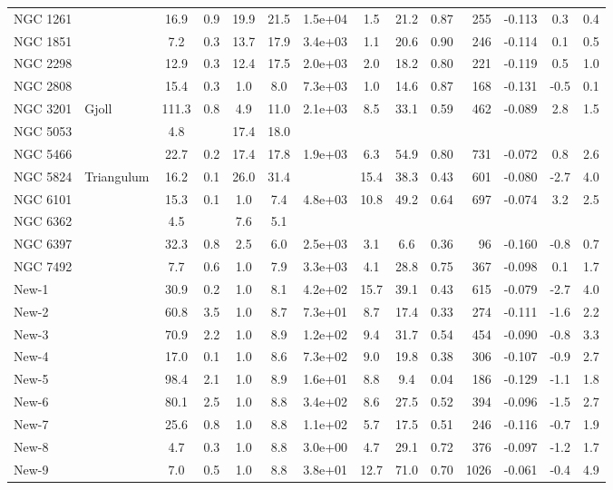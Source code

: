 \begin{tabular}{llSSSSSSSSrSSS}
NGC 1261 &  & 16.9 & 0.9 & 19.9 & 21.5 & 1.5e+04 & 1.5 & 21.2 & 0.87 & 255 & -0.113 & 0.3 & 0.4 \\
NGC 1851 &  & 7.2 & 0.3 & 13.7 & 17.9 & 3.4e+03 & 1.1 & 20.6 & 0.90 & 246 & -0.114 & 0.1 & 0.5 \\
NGC 2298 &  & 12.9 & 0.3 & 12.4 & 17.5 & 2.0e+03 & 2.0 & 18.2 & 0.80 & 221 & -0.119 & 0.5 & 1.0 \\
NGC 2808 &  & 15.4 & 0.3 & 1.0 & 8.0 & 7.3e+03 & 1.0 & 14.6 & 0.87 & 168 & -0.131 & -0.5 & 0.1 \\
NGC 3201 & Gjoll & 111.3 & 0.8 & 4.9 & 11.0 & 2.1e+03 & 8.5 & 33.1 & 0.59 & 462 & -0.089 & 2.8 & 1.5 \\
NGC 5053 &  & 4.8 &  & 17.4 & 18.0 &  &  &  &  &  &  &  &  \\
NGC 5466 &  & 22.7 & 0.2 & 17.4 & 17.8 & 1.9e+03 & 6.3 & 54.9 & 0.80 & 731 & -0.072 & 0.8 & 2.6 \\
NGC 5824 & Triangulum & 16.2 & 0.1 & 26.0 & 31.4 &  & 15.4 & 38.3 & 0.43 & 601 & -0.080 & -2.7 & 4.0 \\
NGC 6101 &  & 15.3 & 0.1 & 1.0 & 7.4 & 4.8e+03 & 10.8 & 49.2 & 0.64 & 697 & -0.074 & 3.2 & 2.5 \\
NGC 6362 &  & 4.5 &  & 7.6 & 5.1 &  &  &  &  &  &  &  &  \\
NGC 6397 &  & 32.3 & 0.8 & 2.5 & 6.0 & 2.5e+03 & 3.1 & 6.6 & 0.36 & 96 & -0.160 & -0.8 & 0.7 \\
NGC 7492 &  & 7.7 & 0.6 & 1.0 & 7.9 & 3.3e+03 & 4.1 & 28.8 & 0.75 & 367 & -0.098 & 0.1 & 1.7 \\
New-1 &  & 30.9 & 0.2 & 1.0 & 8.1 & 4.2e+02 & 15.7 & 39.1 & 0.43 & 615 & -0.079 & -2.7 & 4.0 \\
New-2 &  & 60.8 & 3.5 & 1.0 & 8.7 & 7.3e+01 & 8.7 & 17.4 & 0.33 & 274 & -0.111 & -1.6 & 2.2 \\
New-3 &  & 70.9 & 2.2 & 1.0 & 8.9 & 1.2e+02 & 9.4 & 31.7 & 0.54 & 454 & -0.090 & -0.8 & 3.3 \\
New-4 &  & 17.0 & 0.1 & 1.0 & 8.6 & 7.3e+02 & 9.0 & 19.8 & 0.38 & 306 & -0.107 & -0.9 & 2.7 \\
New-5 &  & 98.4 & 2.1 & 1.0 & 8.9 & 1.6e+01 & 8.8 & 9.4 & 0.04 & 186 & -0.129 & -1.1 & 1.8 \\
New-6 &  & 80.1 & 2.5 & 1.0 & 8.8 & 3.4e+02 & 8.6 & 27.5 & 0.52 & 394 & -0.096 & -1.5 & 2.7 \\
New-7 &  & 25.6 & 0.8 & 1.0 & 8.8 & 1.1e+02 & 5.7 & 17.5 & 0.51 & 246 & -0.116 & -0.7 & 1.9 \\
New-8 &  & 4.7 & 0.3 & 1.0 & 8.8 & 3.0e+00 & 4.7 & 29.1 & 0.72 & 376 & -0.097 & -1.2 & 1.7 \\
New-9 &  & 7.0 & 0.5 & 1.0 & 8.8 & 3.8e+01 & 12.7 & 71.0 & 0.70 & 1026 & -0.061 & -0.4 & 4.9 \\
\hline
\end{tabular}